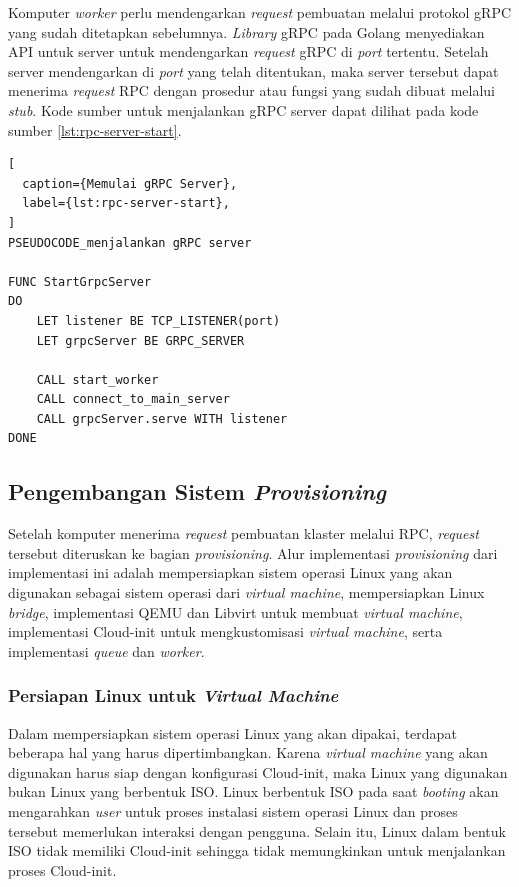 Komputer \emph{worker} perlu mendengarkan \emph{request} pembuatan melalui
protokol gRPC yang sudah ditetapkan sebelumnya. \emph{Library} gRPC pada Golang
menyediakan API untuk server untuk mendengarkan \emph{request} gRPC di \emph{port}
tertentu. Setelah server mendengarkan di \emph{port} yang telah ditentukan, maka
server tersebut dapat menerima \emph{request} RPC dengan prosedur atau fungsi
yang sudah dibuat melalui \emph{stub}. Kode sumber untuk menjalankan
gRPC server dapat dilihat pada kode sumber \ref{lst:rpc-server-start}.

\clearpage

\begin{lstlisting}[
  caption={Memulai gRPC Server},
  label={lst:rpc-server-start},
]
PSEUDOCODE_menjalankan gRPC server

FUNC StartGrpcServer
DO
    LET listener BE TCP_LISTENER(port)
    LET grpcServer BE GRPC_SERVER

    CALL start_worker
    CALL connect_to_main_server
    CALL grpcServer.serve WITH listener
DONE
\end{lstlisting}

\subsection{Pengembangan Sistem \emph{Provisioning}}
\label{sec:provisioning}

Setelah komputer menerima \emph{request} pembuatan klaster melalui RPC,
\emph{request} tersebut diteruskan ke bagian \emph{provisioning}. Alur 
implementasi \emph{provisioning} dari implementasi ini adalah mempersiapkan
sistem operasi Linux yang akan digunakan sebagai sistem operasi dari
\emph{virtual machine}, mempersiapkan Linux \emph{bridge},
implementasi QEMU dan Libvirt untuk membuat \emph{virtual machine},
implementasi Cloud-init untuk mengkustomisasi \emph{virtual machine}, 
serta implementasi \emph{queue} dan \emph{worker}.

\subsubsection{Persiapan Linux untuk \emph{Virtual Machine}}
\label{sec:persiapan-linux-untuk-virtual-machine}

Dalam mempersiapkan sistem operasi Linux yang akan dipakai, terdapat beberapa
hal yang harus dipertimbangkan. Karena \emph{virtual machine} yang akan digunakan
harus siap dengan konfigurasi Cloud-init, maka Linux yang digunakan bukan Linux
yang berbentuk ISO. Linux berbentuk ISO pada saat \emph{booting} akan mengarahkan
\emph{user} untuk proses instalasi sistem operasi Linux dan proses tersebut memerlukan
interaksi dengan pengguna. Selain itu, Linux dalam bentuk ISO tidak memiliki Cloud-init
sehingga tidak memungkinkan untuk menjalankan proses Cloud-init.

